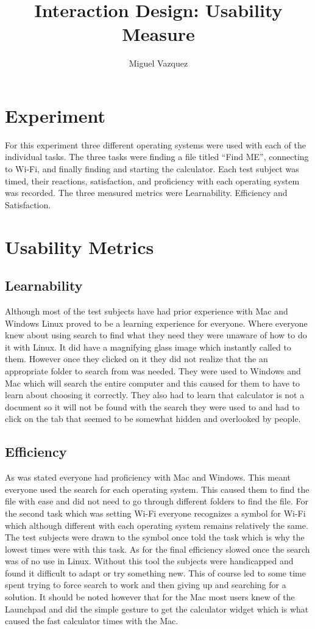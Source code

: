\documentclass[11pt]{article}
\title{Interaction Design: Usability Measure}
\author{Miguel Vazquez}
\begin{document}
\maketitle
\section{Experiment}
For this experiment three different operating systems were used with each of the individual tasks. The three tasks were finding a file titled “Find ME”, connecting to Wi-Fi, and finally finding and starting the calculator. Each test subject was timed, their reactions, satisfaction, and proficiency with each operating system was recorded. The three measured metrics were Learnability. Efficiency and Satisfaction.
\section{Usability Metrics}

\subsection{Learnability}
Although most of the test subjects have had prior experience with Mac and Windows Linux proved to be a learning experience for everyone. Where everyone knew about using search to find what they need they were unaware of how to do it with Linux. It did have a magnifying glass image which instantly called to them. However once they clicked on it they did not realize that the an appropriate folder to search from was needed. They were used to Windows and Mac which will search the entire computer and this caused for them to have to learn about choosing it correctly. They also had to learn that calculator is not a document so it will not be found with the search they were used to and had to click on the tab that seemed to be somewhat hidden and overlooked by people.

\subsection{Efficiency}
As was stated everyone had proficiency with Mac and Windows. This meant everyone used the search for each operating system. This caused them to find the file with ease and did not need to go through different folders to find the file. For the second task which was setting Wi-Fi everyone recognizes a symbol for Wi-Fi which although different with each operating system remains relatively the same. The test subjects were drawn to the symbol once told the task which is why the lowest times were with this task. As for the final efficiency slowed once the search was of no use in Linux. Without this tool the subjects were handicapped and found it difficult to adapt or try something new. This of course led to some time spent trying to force search to work and then giving up and searching for a solution. It should be noted however that for the Mac most users knew of the Launchpad and did the simple gesture to get the calculator widget which is what caused the fast calculator times with the Mac.
\end{document}
